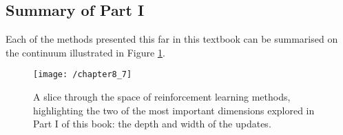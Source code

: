 \subsection{Summary of Part I}
Each of the methods presented this far in this textbook can be summarised on the continuum illustrated in Figure \ref{fig: part1 summary}.

\begin{figure}
	\centering
	\texttt{[image: /chapter8\_7]}
	\caption{A slice through the space of reinforcement learning methods, highlighting the two of the most important dimensions explored in Part I of this book: the depth and width of the updates.}
	\label{fig: part1 summary}
\end{figure}

